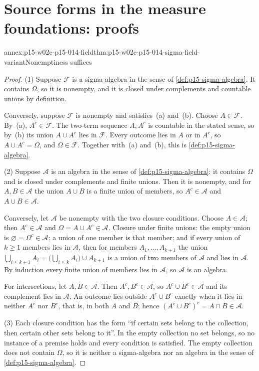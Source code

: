 \section{Source forms in the measure foundations: proofs}
\label{sec:annex-p15-w02c-p15-014-foundations}

\begin{annexitem}{annex:p15-w02c-p15-014-field}{thm:p15-w02c-p15-014-sigma-field-variant}{Nonemptiness suffices}
\begin{proof}
(1) Suppose \(\mathcal F\) is a sigma-algebra in the sense of
\cref{def:p15-sigma-algebra}. It contains \(\Omega\), so it is nonempty,
and it is closed under complements and countable unions by definition.

Conversely, suppose \(\mathcal F\) is nonempty and satisfies~(a)
and~(b). Choose \(A\in\mathcal F\). By~(a), \(A^c\in\mathcal F\). The
two-term sequence \(A,A^c\) is countable in the stated sense, so by~(b)
its union \(A\cup A^c\) lies in \(\mathcal F\). Every outcome lies in
\(A\) or in \(A^c\), so \(A\cup A^c=\Omega\), and \(\Omega\in\mathcal F\).
Together with~(a) and~(b), this is \cref{def:p15-sigma-algebra}.

(2) Suppose \(\mathcal A\) is an algebra in the sense of
\cref{def:p15-sigma-algebra}: it contains \(\Omega\) and is closed
under complements and finite unions. Then it is nonempty, and for
\(A,B\in\mathcal A\) the union \(A\cup B\) is a finite union of members,
so \(A^c\in\mathcal A\) and \(A\cup B\in\mathcal A\).

Conversely, let \(\mathcal A\) be nonempty with the two closure
conditions. Choose \(A\in\mathcal A\); then \(A^c\in\mathcal A\) and
\(\Omega=A\cup A^c\in\mathcal A\). Closure under finite unions: the
empty union is \(\varnothing=\Omega^c\in\mathcal A\); a union of one
member is that member; and if every union of \(k\geq1\) members lies in
\(\mathcal A\), then for members \(A_1,\ldots,A_{k+1}\) the union
\(\bigcup_{i\leq k+1}A_i=\bigl(\bigcup_{i\leq k}A_i\bigr)\cup A_{k+1}\)
is a union of two members of \(\mathcal A\) and lies in \(\mathcal A\).
By induction every finite union of members lies in \(\mathcal A\), so
\(\mathcal A\) is an algebra.

For intersections, let \(A,B\in\mathcal A\). Then
\(A^c,B^c\in\mathcal A\), so \(A^c\cup B^c\in\mathcal A\) and its
complement lies in \(\mathcal A\). An outcome lies outside
\(A^c\cup B^c\) exactly when it lies in neither \(A^c\) nor \(B^c\),
that is, in both \(A\) and \(B\); hence
\((A^c\cup B^c)^c=A\cap B\in\mathcal A\).

(3) Each closure condition has the form ``if certain sets belong to the
collection, then certain other sets belong to it''. In the empty
collection no set belongs, so no instance of a premise holds and every
condition is satisfied. The empty collection does not contain \(\Omega\),
so it is neither a sigma-algebra nor an algebra in the sense of
\cref{def:p15-sigma-algebra}.
\end{proof}
\end{annexitem}

